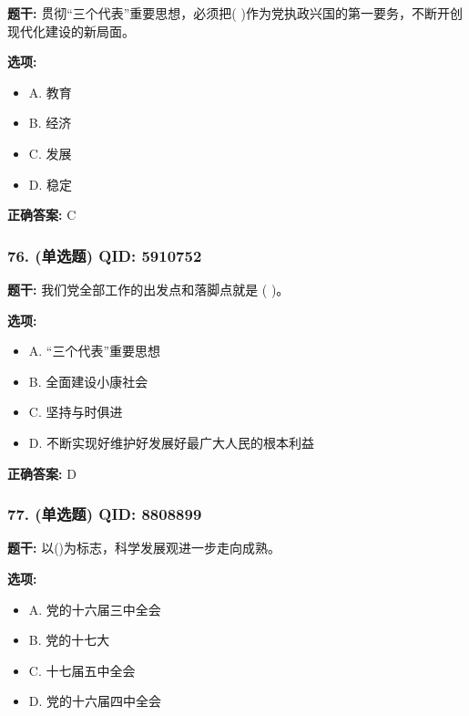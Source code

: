 \documentclass[12pt,UTF8]{ctexart}
\begin{document}
\textbf{题干:}
贯彻“三个代表”重要思想，必须把( )作为党执政兴国的第一要务，不断开创现代化建设的新局面。

\textbf{选项:}
\begin{itemize}[leftmargin=*]

  \item A. 教育

  \item B. 经济

  \item C. 发展

  \item D. 稳定

\end{itemize}

\textbf{正确答案:}
C

\vspace{0.3em}\hrulefill\vspace{0.7em}

\subsubsection*{76. (单选题) \small QID: 5910752}

\textbf{题干:}
我们党全部工作的出发点和落脚点就是 ( )。

\textbf{选项:}
\begin{itemize}[leftmargin=*]

  \item A. “三个代表”重要思想

  \item B. 全面建设小康社会

  \item C. 坚持与时俱进

  \item D. 不断实现好维护好发展好最广大人民的根本利益

\end{itemize}

\textbf{正确答案:}
D

\vspace{0.3em}\hrulefill\vspace{0.7em}

\subsubsection*{77. (单选题) \small QID: 8808899}

\textbf{题干:}
以()为标志，科学发展观进一步走向成熟。

\textbf{选项:}
\begin{itemize}[leftmargin=*]

  \item A. 党的十六届三中全会

  \item B. 党的十七大

  \item C. 十七届五中全会

  \item D. 党的十六届四中全会

\end{itemize}
\end{document}
